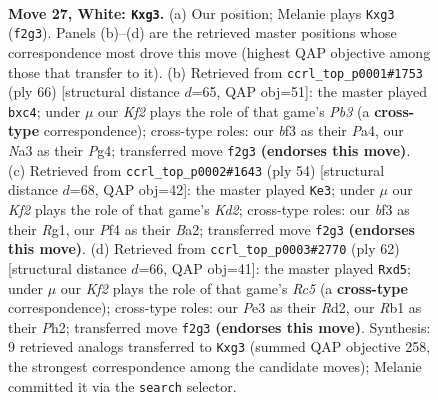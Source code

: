 \documentclass[11pt]{article}
\begin{document}
\clearpage

\begin{figure}[p]\centering
\begin{subfigure}{0.46\textwidth}\centering
\resizebox{\linewidth}{!}{%
\newchessgame
\chessboard[
  setfen={1r1r4/pp4k1/6pp/2pB4/4pP1P/N3Pbn1/PP3K2/1RB5 w - - 2 27},
  showmover=false,
  pgfstyle=straightmove, color=movearrow, markmove={f2-g3}
]}
\caption{}
\end{subfigure}\hfill
\begin{subfigure}{0.46\textwidth}\centering
\resizebox{\linewidth}{!}{%
\newchessgame
\chessboard[
  setfen={2r4b/2r1pk1p/3pp2P/1B6/P1n1PBP1/1PP2P2/2K4p/5R2 w - - 0 34},
  showmover=false,
  pgfstyle=straightmove, color=movearrow, markmove={b3-c4}
]}
\caption{}
\end{subfigure}
\\[4pt]
\begin{subfigure}{0.46\textwidth}\centering
\resizebox{\linewidth}{!}{%
\newchessgame
\chessboard[
  setfen={2rr2k1/5pp1/pn2p2p/4P2P/3B1PP1/R7/B1PKb3/6R1 w - - 7 28},
  showmover=false,
  pgfstyle=straightmove, color=movearrow, markmove={d2-e3}
]}
\caption{}
\end{subfigure}\hfill
\begin{subfigure}{0.46\textwidth}\centering
\resizebox{\linewidth}{!}{%
\newchessgame
\chessboard[
  setfen={r7/r4pk1/4pb1p/N1Rn2p1/p2B4/P4P2/KP1R2PP/8 w - - 2 32},
  showmover=false,
  pgfstyle=straightmove, color=movearrow, markmove={c5-d5}
]}
\caption{}
\end{subfigure}
\caption{\textbf{Move 27, White: \texttt{Kxg3}.} (a) Our position; Melanie plays \texttt{Kxg3} (\texttt{f2g3}). Panels (b)--(d) are the retrieved master positions whose correspondence most drove this move (highest QAP objective among those that transfer to it). (b) Retrieved from \texttt{ccrl\_top\_p0001\#1753} (ply 66) [structural distance $d$=65, QAP obj=51]: the master played \texttt{bxc4}; under $\mu$ our \emph{Kf2} plays the role of that game's \emph{Pb3} (a \textbf{cross-type} correspondence); cross-type roles: our \emph{b}f3 as their \emph{P}a4, our \emph{N}a3 as their \emph{P}g4; transferred move \texttt{f2g3} \textbf{(endorses this move)}. (c) Retrieved from \texttt{ccrl\_top\_p0002\#1643} (ply 54) [structural distance $d$=68, QAP obj=42]: the master played \texttt{Ke3}; under $\mu$ our \emph{Kf2} plays the role of that game's \emph{Kd2}; cross-type roles: our \emph{b}f3 as their \emph{R}g1, our \emph{P}f4 as their \emph{B}a2; transferred move \texttt{f2g3} \textbf{(endorses this move)}. (d) Retrieved from \texttt{ccrl\_top\_p0003\#2770} (ply 62) [structural distance $d$=66, QAP obj=41]: the master played \texttt{Rxd5}; under $\mu$ our \emph{Kf2} plays the role of that game's \emph{Rc5} (a \textbf{cross-type} correspondence); cross-type roles: our \emph{P}e3 as their \emph{R}d2, our \emph{R}b1 as their \emph{P}h2; transferred move \texttt{f2g3} \textbf{(endorses this move)}. Synthesis: 9 retrieved analogs transferred to \texttt{Kxg3} (summed QAP objective 258, the strongest correspondence among the candidate moves); Melanie committed it via the \texttt{search} selector.}
\label{fig:thought-m52}
\end{figure}
\end{document}
